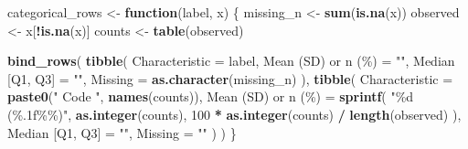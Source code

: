 \documentclass[
]{article}
\newenvironment{Shaded}{\begin{snugshade}}{\end{snugshade}}
\newcommand{\AttributeTok}[1]{\textcolor[rgb]{0.13,0.29,0.53}{#1}}
\newcommand{\ControlFlowTok}[1]{\textcolor[rgb]{0.13,0.29,0.53}{\textbf{#1}}}
\newcommand{\DecValTok}[1]{\textcolor[rgb]{0.00,0.00,0.81}{#1}}
\newcommand{\FunctionTok}[1]{\textcolor[rgb]{0.13,0.29,0.53}{\textbf{#1}}}
\newcommand{\NormalTok}[1]{#1}
\newcommand{\OtherTok}[1]{\textcolor[rgb]{0.56,0.35,0.01}{#1}}
\newcommand{\SpecialCharTok}[1]{\textcolor[rgb]{0.81,0.36,0.00}{\textbf{#1}}}
\newcommand{\StringTok}[1]{\textcolor[rgb]{0.31,0.60,0.02}{#1}}
\begin{document}
\begin{Shaded}
\begin{Highlighting}[]
\NormalTok{categorical\_rows }\OtherTok{\textless{}{-}} \ControlFlowTok{function}\NormalTok{(label, x) \{}
\NormalTok{  missing\_n }\OtherTok{\textless{}{-}} \FunctionTok{sum}\NormalTok{(}\FunctionTok{is.na}\NormalTok{(x))}
\NormalTok{  observed }\OtherTok{\textless{}{-}}\NormalTok{ x[}\SpecialCharTok{!}\FunctionTok{is.na}\NormalTok{(x)]}
\NormalTok{  counts }\OtherTok{\textless{}{-}} \FunctionTok{table}\NormalTok{(observed)}

  \FunctionTok{bind\_rows}\NormalTok{(}
    \FunctionTok{tibble}\NormalTok{(}
      \AttributeTok{Characteristic =}\NormalTok{ label,}
      \StringTok{\textasciigrave{}}\AttributeTok{Mean (SD) or n (\%)}\StringTok{\textasciigrave{}} \OtherTok{=} \StringTok{""}\NormalTok{,}
      \StringTok{\textasciigrave{}}\AttributeTok{Median [Q1, Q3]}\StringTok{\textasciigrave{}} \OtherTok{=} \StringTok{""}\NormalTok{,}
      \AttributeTok{Missing =} \FunctionTok{as.character}\NormalTok{(missing\_n)}
\NormalTok{    ),}
    \FunctionTok{tibble}\NormalTok{(}
      \AttributeTok{Characteristic =} \FunctionTok{paste0}\NormalTok{(}\StringTok{"  Code "}\NormalTok{, }\FunctionTok{names}\NormalTok{(counts)),}
      \StringTok{\textasciigrave{}}\AttributeTok{Mean (SD) or n (\%)}\StringTok{\textasciigrave{}} \OtherTok{=} \FunctionTok{sprintf}\NormalTok{(}
        \StringTok{"\%d (\%.1f\%\%)"}\NormalTok{,}
        \FunctionTok{as.integer}\NormalTok{(counts),}
        \DecValTok{100} \SpecialCharTok{*} \FunctionTok{as.integer}\NormalTok{(counts) }\SpecialCharTok{/} \FunctionTok{length}\NormalTok{(observed)}
\NormalTok{      ),}
      \StringTok{\textasciigrave{}}\AttributeTok{Median [Q1, Q3]}\StringTok{\textasciigrave{}} \OtherTok{=} \StringTok{""}\NormalTok{,}
      \AttributeTok{Missing =} \StringTok{""}
\NormalTok{    )}
\NormalTok{  )}
\NormalTok{\}}
\end{Highlighting}
\end{Shaded}
\end{document}
